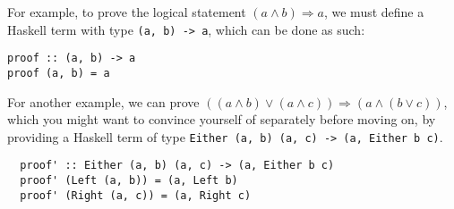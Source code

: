 \documentclass[12pt,twoside]{report}
\begin{document}
For example, to prove the logical statement $(a \wedge b) \Rightarrow a$, we must define a Haskell term with type \verb|(a, b) -> a|, which can be done as such:

\begin{verbatim}
proof :: (a, b) -> a
proof (a, b) = a
\end{verbatim}

For another example, we can prove $((a \wedge b) \vee (a \wedge c)) \Rightarrow (a \wedge (b \vee c))$, which you might want to convince yourself of separately before moving on, by providing a Haskell term of type \verb|Either (a, b) (a, c) -> (a, Either b c)|.

\begin{verbatim}
  proof' :: Either (a, b) (a, c) -> (a, Either b c)
  proof' (Left (a, b)) = (a, Left b)
  proof' (Right (a, c)) = (a, Right c)
\end{verbatim}

\end{document}
